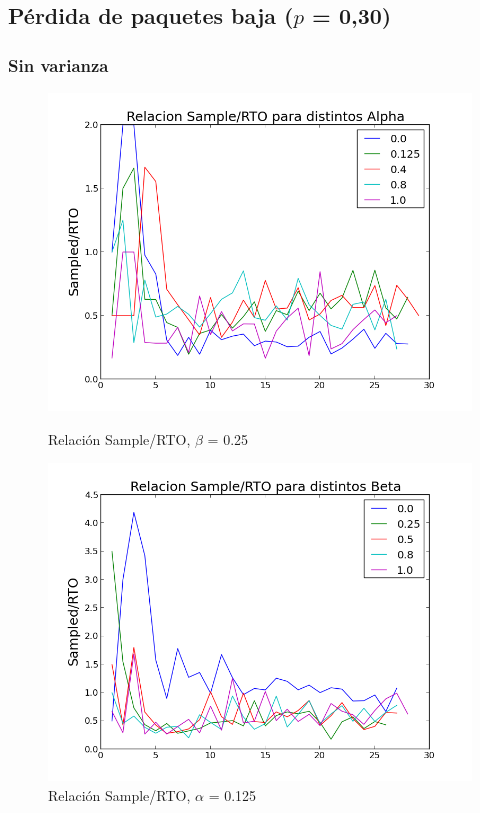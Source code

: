 \subsection{Pérdida de paquetes baja ($p$ = 0,30)}
\subsubsection{Sin varianza}

\begin{figure}[H]
\begin{minipage}{0.5\linewidth}
\includegraphics[width=\linewidth]{../graficos/alphavar0drop30.png}
\caption{Relación Sample/RTO, $\beta$ = 0.25}\label{fig:alpha-var0-drop30}
\end{minipage}
\hfill
\begin{minipage}{0.5\linewidth}
\includegraphics[width=\linewidth]{../graficos/betavar0drop30.png}
\caption{Relación Sample/RTO, $\alpha$ = 0.125}\label{fig:beta-var0-drop30}
\end{minipage}
\end{figure}

